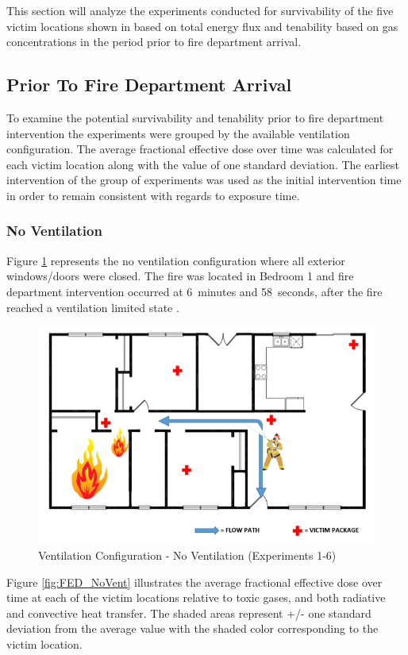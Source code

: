 \documentclass[12pt,oneside]{book}
\begin{document}
This section will analyze the experiments conducted for survivability of the five victim locations shown in  based on total energy flux and tenability based on gas concentrations in the period prior to fire department arrival. 

\subsection{Prior To Fire Department Arrival}
To examine the potential survivability and tenability prior to fire department intervention the experiments were grouped by the available ventilation configuration. The average fractional effective dose over time was calculated for each victim location along with the value of one standard deviation. The earliest intervention of the group of experiments was used as the initial intervention time in order to remain consistent with regards to exposure time.

\subsubsection{No Ventilation}

Figure \ref{fig:Vent_Profile-No_Vent} represents the no ventilation configuration where all exterior windows/doors were closed. The fire was located in Bedroom 1 and fire department intervention occurred at 6~minutes and 58~seconds, after the fire reached a ventilation limited state . 

\begin{figure}[H]
	\centering
	\includegraphics[width=.65\textwidth]{../0_Images/Ventilation_Configurations/No_Vent.png}
	\caption{Ventilation Configuration - No Ventilation (Experiments 1-6)}
	\label{fig:Vent_Profile-No_Vent}
\end{figure}

 Figure \ref{fig:FED_NoVent} illustrates the average fractional effective dose over time at each of the victim locations relative to toxic gases, and both radiative and convective heat transfer. The shaded areas represent +/- one standard deviation from the average value with the shaded color corresponding to the victim location. 
\end{document}
